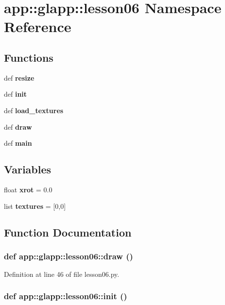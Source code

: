 \section{app::glapp::lesson06 Namespace Reference}
\label{namespaceapp_1_1glapp_1_1lesson06}


\subsection*{Functions}
\begin{CompactItemize}
\item 
def {\bf resize}
\item 
def {\bf init}
\item 
def {\bf load\_\-textures}
\item 
def {\bf draw}
\item 
def {\bf main}
\end{CompactItemize}
\subsection*{Variables}
\begin{CompactItemize}
\item 
float {\bf xrot} = 0.0
\item 
list {\bf textures} = [0,0]
\end{CompactItemize}


\subsection{Function Documentation}
\subsubsection{\setlength{\rightskip}{0pt plus 5cm}def app::glapp::lesson06::draw ()}\label{namespaceapp_1_1glapp_1_1lesson06_fbb3e1d73adbe6ceb378fbed0d0d5d94}




Definition at line 46 of file lesson06.py.
\subsubsection{\setlength{\rightskip}{0pt plus 5cm}def app::glapp::lesson06::init ()}\label{namespaceapp_1_1glapp_1_1lesson06_649cde486c2b1c58b61b38d1e3727bea}




